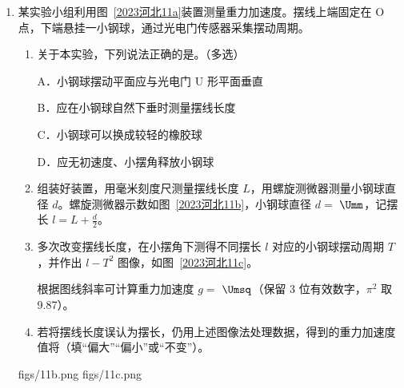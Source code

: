\documentclass[\gkver]{gaokaozhenti}
\begin{document}
\begin{enumerate}
{B．取无穷远处为零电势点，由于正点电荷周围的电势为正值，若在 O 点放一正点电荷，则 A、B 两点的电势一定升高，故 B 正确；

C．试探电荷 $q$ 沿 $y$ 轴运动过程中，根据电荷分布，若静电力始终不做功，则经过 $y$ 轴且垂直于 $x$ 轴的平面为等势面，但静电力不一定为零，故 C 错误；

D．根据以 O 点为球心、以 OC 为半径的球面为等势面，可知 C 点的电场强度方向应与 $y$ 轴重合，再根据经过 $y$ 轴且垂直于 $x$ 轴的平面为等势面，可知 C 点的电场强度方向应与轴垂直，同一点电场强度的方向是唯一的，故 C 点的电场强度一定为零，故 D 正确。

故选 BD。
}

\item
某实验小组利用图~\ref{2023河北11a}装置测量重力加速度。摆线上端固定在 O 点，下端悬挂一小钢球，通过光电门传感器采集摆动周期。
\begin{enumerate}
	\item
	关于本实验，下列说法正确的是。（多选）

	A．小钢球摆动平面应与光电门 U 形平面垂直

	B．应在小钢球自然下垂时测量摆线长度

	C．小钢球可以换成较轻的橡胶球

	D．应无初速度、小摆角释放小钢球

	\item
	组装好装置，用毫米刻度尺测量摆线长度 $L$，用螺旋测微器测量小钢球直径 $d$。螺旋测微器示数如图~\ref{2023河北11b}，小钢球直径 $d=$ $\Umm$，记摆长 $l=L+\frac{d}{2}$。

	\item
	多次改变摆线长度，在小摆角下测得不同摆长 $l$ 对应的小钢球摆动周期 $T$，并作出 $l-T^{2}$ 图像，如图~\ref{2023河北11c}。

	根据图线斜率可计算重力加速度 $g=$ $\Umsq$（保留 3 位有效数字，$\pi^{2}$ 取 9.87）。

	\item
	若将摆线长度误认为摆长，仍用上述图像法处理数据，得到的重力加速度值将（填“偏大”“偏小”或“不变”）。
\end{enumerate}

{figs/11b.png}
{figs/11c.png}


\end{enumerate}
\end{document}
